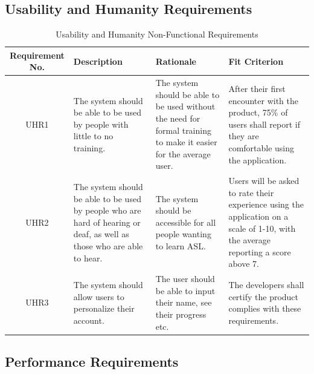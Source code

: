 \documentclass[12pt, titlepage]{article}
\begin{document}
\subsection{Usability and Humanity Requirements}

\begin{table}[H]
\caption{Usability and Humanity Non-Functional Requirements}
\noindent \begin{tabular}{| c | p{3cm}| p{3cm}| p{3cm}|}
\hline 
\textbf{Requirement No.} & \textbf{Description} & \textbf{Rationale} & \textbf{Fit Criterion}\\
\hline
UHR1 & The system should be able to be used by people with little to no training. & The system should be able to be used without the need for formal training to make it easier for the average user. & After their first encounter with the product, 75\% of users shall report if they are comfortable using the application.\\
\hline
UHR2 & The system should be able to be used by people who are hard of hearing or deaf, as well as those who are able to hear. & The system should be accessible for all people wanting to learn ASL. & Users will be asked to rate their experience using the application on a scale of 1-10, with the average reporting a score above 7. \\
\hline
UHR3 & The system should allow users to personalize their account. & The user should be able to input their name, see their progress etc. & The developers shall certify the product complies with these requirements. \\
\bottomrule
\end{tabular}
\end{table}

\subsection{Performance Requirements}
\end{document}
